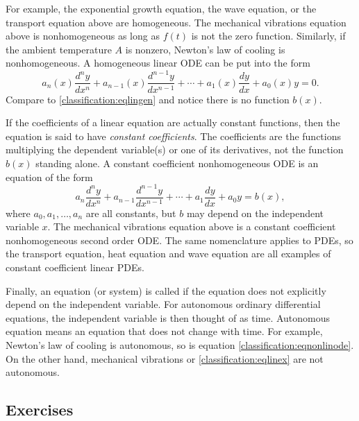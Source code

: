 For example,
the exponential growth equation, the wave equation, or the transport equation above
are homogeneous. The mechanical vibrations equation above is nonhomogeneous
as long as $f(t)$ is not the zero function.  Similarly, if the ambient temperature $A$ is nonzero,
Newton's law of cooling is nonhomogeneous.
A homogeneous linear ODE can be put into the form
\begin{equation*}
a_n(x) \frac{d^n y}{dx^n} + 
a_{n-1}(x) \frac{d^{n-1} y}{dx^{n-1}} + 
\cdots
+
a_{1}(x) \frac{dy}{dx}
+
a_{0}(x) y = 0 .
\end{equation*}
Compare to \eqref{classification:eqlingen} and notice there is no
function $b(x)$.

\medskip

If the coefficients of a linear equation are actually constant functions,
then the equation is said to have
\emph{constant coefficients}.
The coefficients are the functions multiplying the dependent
variable(s) or one of its derivatives, not the function $b(x)$ standing alone.
A constant coefficient nonhomogeneous ODE is an equation of the form
\begin{equation*}
a_n \frac{d^n y}{dx^n} + 
a_{n-1} \frac{d^{n-1} y}{dx^{n-1}} + 
\cdots
+
a_{1} \frac{dy}{dx}
+
a_{0} y = b(x) ,
\end{equation*}
where $a_0, a_1, \ldots, a_n$ are all constants,
but $b$ may depend on 
the independent variable $x$.
The mechanical vibrations equation
above is a constant coefficient nonhomogeneous second order ODE\@.
The same nomenclature applies to PDEs, so the transport equation,
heat equation and wave equation are all examples of constant coefficient
linear PDEs.

\medskip

Finally, an equation (or system) is called \emph{}
if the equation does not explicitly depend on the independent variable.
For autonomous ordinary differential equations, the
independent variable is then thought of as time.  Autonomous equation
means an equation that does not change with time.
For example, Newton's law of cooling is autonomous, so is equation
\eqref{classification:eqnonlinode}.  On the other hand, mechanical
vibrations or 
\eqref{classification:eqlinex} are not autonomous.

\subsection{Exercises}

